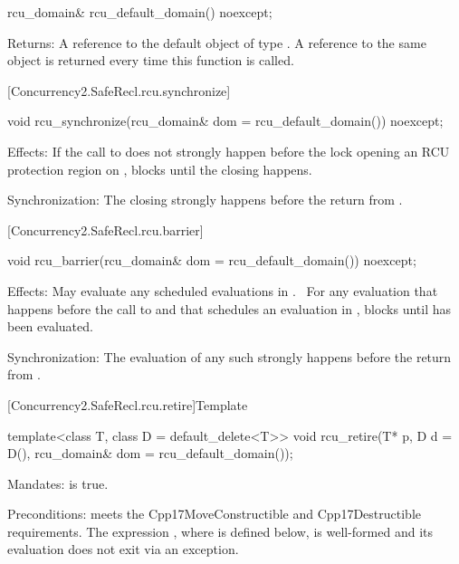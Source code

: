 \begin{codeblock}
rcu_domain& rcu_default_domain() noexcept;
\end{codeblock}

\pnum
Returns: A reference to the default object of type .
A reference to the same object is returned every time this
function is called.

[Concurrency2.SafeRecl.rcu.synchronize]{}

\begin{codeblock}
void rcu_synchronize(rcu_domain& dom = rcu_default_domain()) noexcept;
\end{codeblock}

\pnum
Effects: If the call to  does not strongly
happen before the lock opening an RCU protection region 
on , blocks until the  closing 
happens.

\pnum
Synchronization: The  closing  strongly
happens before the return from .

[Concurrency2.SafeRecl.rcu.barrier]{}

\begin{codeblock}
void rcu_barrier(rcu_domain& dom = rcu_default_domain()) noexcept;
\end{codeblock}

\pnum
Effects: May evaluate any scheduled evaluations in
.  For any evaluation that happens before the call
to  and that schedules an evaluation 
in , blocks until  has been evaluated.  

\pnum
Synchronization: The evaluation of any such  strongly
happens before the return from .

[Concurrency2.SafeRecl.rcu.retire]{Template }

\begin{codeblock}
template<class T, class D = default_delete<T>>
void rcu_retire(T* p, D d = D(), rcu_domain& dom = rcu_default_domain());
\end{codeblock}

\pnum
Mandates:  is true.

\pnum
Preconditions:  meets the Cpp17MoveConstructible and
Cpp17Destructible requirements.
The expression , where  is defined below, is
well-formed and its evaluation does not exit via an exception.

